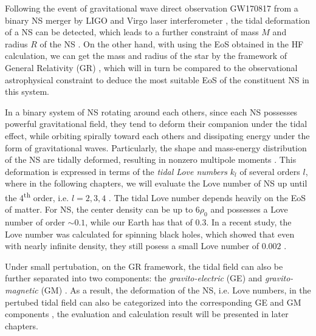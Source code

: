 
Following the event of gravitational wave direct observation GW170817 from a binary \gls{NS} merger by LIGO and Virgo laser interferometer \cite{abbott2017gw170817}, the tidal deformation of a \gls{NS} can be detected, which leads to a further constraint of mass $M$ and radius $R$ of the \gls{NS} \cite{abbott2018gw170817}. On the other hand, with using the \gls{EoS} obtained in the \gls{HF} calculation, we can get the mass and radius of the star by the framework of General Relativity (\gls{GR}) \cite{tan2020spin,tan2021equation}, which will in turn be compared to the observational astrophysical constraint to deduce the most suitable \gls{EoS} of the constituent \gls{NS} in this system.\par
In a binary system of \gls{NS} rotating around each others, since each \gls{NS} possesses powerful gravitational field, they tend to deform their companion under the tidal effect, while orbiting spirally toward each others and dissipating energy under the form of gravitational waves. Particularly, the shape and mass-energy distribution of the \gls{NS} are tidally deformed, resulting in nonzero multipole moments \cite{hinderer2008tidal,hinderer2010tidal,damour2009relativistic}. This deformation is expressed in terms of the \emph{tidal Love numbers} $k_l$ of several orders $l$, where in the following chapters, we will evaluate the Love number of \gls{NS} up until the 4\textsuperscript{th} order, i.e. $l=2,3,4$ \cite{perot2021role}. The tidal Love number depends heavily on the \gls{EoS} of matter. For \gls{NS}, the center density can be up to $6\rho_0$ and possesses a Love number of order $\sim 0.1$, while our Earth has that of $0.3$. In a recent study, the Love number was calculated for spinning black holes, which showed that even with nearly infinite density, they still posess a small Love number of $0.002$ \cite{le2021spinning}.\par
Under small pertubation, on the \gls{GR} framework, the tidal field can also be further separated into two components: the \emph{gravito-electric} (\gls{GE}) and \emph{gravito-magnetic} (\gls{GM}) \cite{damour2009relativistic}. As a result, the deformation of the \gls{NS}, i.e. Love numbers, in the pertubed tidal field can also be categorized into the corresponding \gls{GE} and \gls{GM} components \cite{perot2021role}, the evaluation and calculation result will be presented in later chapters.
